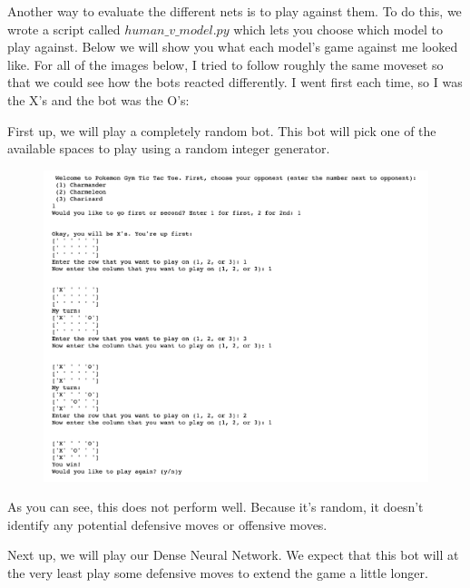 
	
	


Another way to evaluate the different nets is to play against them. To do this, we wrote a script called $human\_v\_model.py$ which lets you choose which model to play against. Below we will show you what each model's game against me looked like. For all of the images below, I tried to follow roughly the same moveset so that we could see how the bots reacted differently. I went first each time, so I was the X's and the bot was the O's:

First up, we will play a completely random bot. This bot will pick one of the available spaces to play using a random integer generator. 
\begin{figure}[H]
	\centering
	\includegraphics[scale=.3]{h_v_random}
\end{figure}
As you can see, this does not perform well. Because it's random, it doesn't identify any potential defensive moves or offensive moves.

Next up, we will play our Dense Neural Network. We expect that this bot will at the very least play some defensive moves to extend the game a little longer. 

